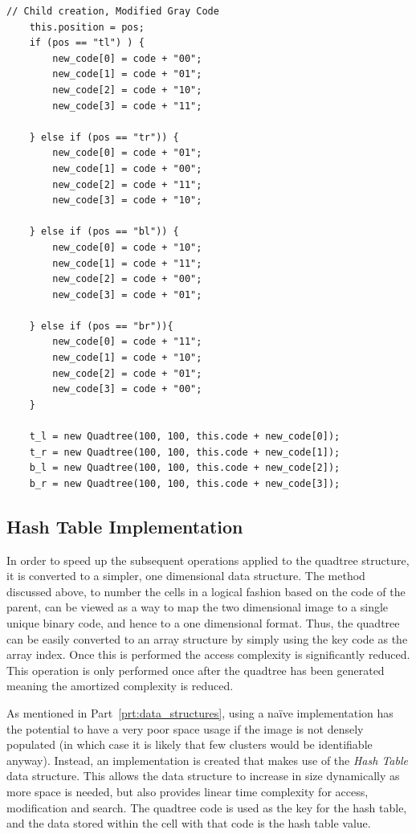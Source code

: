 \begin{lstlisting}[caption={Code to generate children of the current quadtree
while maintaining the correct ordering. Modified Gray code order. Since the
ordering is different for each quadrant, the ordering is changed depending on
the position of the current node.},
label=code:child_construction_mgc]
	// Child creation, Modified Gray Code
	this.position = pos;
	if (pos == "tl") ) {
		new_code[0] = code + "00";
		new_code[1] = code + "01";
		new_code[2] = code + "10";
		new_code[3] = code + "11";

	} else if (pos == "tr")) {
		new_code[0] = code + "01";
		new_code[1] = code + "00";
		new_code[2] = code + "11";
		new_code[3] = code + "10";

	} else if (pos == "bl")) {
		new_code[0] = code + "10";
		new_code[1] = code + "11";
		new_code[2] = code + "00";
		new_code[3] = code + "01";

	} else if (pos == "br")){
		new_code[0] = code + "11";
		new_code[1] = code + "10";
		new_code[2] = code + "01";
		new_code[3] = code + "00";
	}

	t_l = new Quadtree(100, 100, this.code + new_code[0]);
	t_r = new Quadtree(100, 100, this.code + new_code[1]);
	b_l = new Quadtree(100, 100, this.code + new_code[2]);
	b_r = new Quadtree(100, 100, this.code + new_code[3]);
\end{lstlisting}

\subsection{Hash Table Implementation}
\label{sub:hash_table_implementation}

In order to speed up the subsequent operations applied to the quadtree
structure, it is converted to a simpler, one dimensional data structure. The
method discussed above, to number the cells in a logical fashion based on the
code of the parent, can be viewed as a way to map the two dimensional image to
a single unique binary code, and hence to a one dimensional format. Thus, the
quadtree can be easily converted to an array structure by simply using the key
code as the array index. Once this is performed the access complexity is
significantly reduced. This operation is only performed once after the quadtree
has been generated meaning the amortized complexity is reduced.

As mentioned in Part~\ref{prt:data_structures}, using a na\"ive implementation
has the potential to have a very poor space usage if the image is not densely
populated (in which case it is likely that few clusters would be identifiable
anyway). Instead, an implementation is created that makes use of the \emph{Hash
Table} data structure\cite{cormen2001introduction}. This allows the data
structure to increase in size dynamically as more space is needed, but also
provides linear time complexity for access, modification and search. The
quadtree code is used as the key for the hash table, and the data stored within
the cell with that code is the hash table value.

